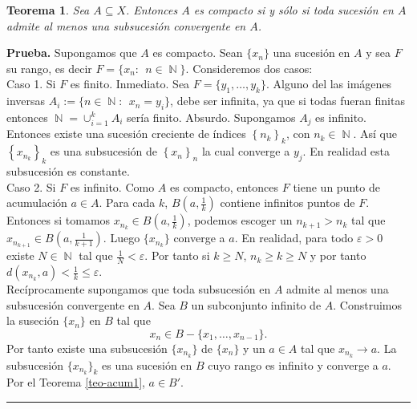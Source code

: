 \documentclass[x11names, 12pt]{book}
\newtheorem{teorema}{Teorema}
\newenvironment{prueba}[1][Prueba]{\noindent\textbf{#1.} }{\ \rule{0.5em}{0.5em}}
\DeclareMathOperator{\ene}{\mathbb{N}}
\begin{document}
\begin{teorema}\label{comp-subsu}
Sea $A\subseteq X$. Entonces $A$ es compacto si y sólo si toda sucesión en $A$ admite al menos una subsucesión convergente en $A$.
\end{teorema}
\begin{prueba}
Supongamos que $A$ es compacto. Sean $\{x_n\}$ una sucesión en $A$ y sea $F$ su rango, es decir \linebreak $F=\{x_n: \ \ n\in \ene\}$. Consideremos dos casos: \\
Caso 1. Si $F$ es finito. Inmediato. Sea $F=\{y_1, \dots , y_k \}$. Alguno del las imágenes inversas \linebreak $A_i:=\{n \in  \ene: \ \  x_n= y_i \}$, debe ser infinita, ya que si todas fueran finitas entonces $\ene=\cup_{i=1}^kA_i$ sería finito. Absurdo. Supongamos $A_j$ es infinito. Entonces existe una sucesión creciente de índices $\left\{ n_k\right\}_k$, con $n_k\in \ene$. Así que $\left\{ x_{n_k}\right\}_k$ es una subsucesión de $\left\{ x_n \right\}_n$ la cual converge a $y_j$. En realidad esta subsucesión es constante. \\
Caso 2. Si $F$ es infinito. Como $A$ es compacto, entonces $F$ tiene un punto de acumulación $a\in A$. Para cada $k$, $B(a, \frac{1}k)$ contiene infinitos puntos de $F$. Entonces si tomamos $x_{n_k}\in B(a, \frac{1}k)$, podemos escoger un $n_{k+1} > n_{k}$ tal que $x_{n_{k+1}}\in  B(a, \frac{1}{k+1}).$ Luego $\{x_{n_k}\}$ converge a $a$. En realidad, para todo $\varepsilon >0$ existe $N\in \ene$ tal que $\frac{1}N < \varepsilon $. Por tanto si $k\geq N$, $n_k \geq k \geq N$ y por tanto $d(x_{n_k}, a) < \frac{1}k \leq \varepsilon$. \\
Recíprocamente supongamos que toda subsucesión en $A$ admite al menos una subsucesión convergente en $A$. Sea $B$ un subconjunto infinito de $A$.
Construimos la suseción $\{x_n\}$ en $B$ tal que \[x_n\in B-\{x_1, \dots, x_{n-1}\}.\] Por tanto existe una subsucesión $\{x_{n_k}\}$ de $\{x_n\}$ y un $a\in A$ tal que $x_{n_k} \to a$. La subsucesión $\{x_{n_k}\}_k$ es una sucesión en $B$ cuyo rango es infinito y converge a $a$. Por el Teorema \ref{teo-acum1}, $a\in B'$.
\end{prueba}
\end{document}
